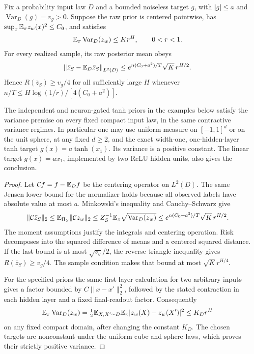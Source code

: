 \begin{corollary}
\label{cor:continuous-raw-depth-lower}
Fix a probability input law $D$ and a bounded noiseless target $g$,
with $|g|\le a$ and $\operatorname{Var}_D(g)=v_g>0$.
Suppose the raw prior is centered pointwise, has
$\sup_x\mathbb E_\pi z_w(x)^2\le C_0$, and satisfies
\[
 \mathbb E_\pi\operatorname{Var}_D(z_w)\le K r^H,\qquad 0<r<1.
\]
For every realized sample, its raw posterior mean obeys
\[
 \left\|\bar z_S-\mathbb E_D\bar z_S\right\|_{L^2(D)}
 \le e^{n(C_0+a^2)/T}\sqrt K\,r^{H/2}.
\]
Hence $R(\bar z_S)\ge v_g/4$ for all sufficiently large $H$ whenever
$n/T\le H\log(1/r)/[4(C_0+a^2)]$.

The independent and neuron-gated tanh priors in the examples below
satisfy the variance premise on every fixed compact input law,
in the same contractive variance regimes. In particular one may use
uniform measure on $[-1,1]^d$ or on the unit sphere, at any fixed
$d\ge2$, and the exact width-one, one-hidden-layer tanh target
$g(x)=a\tanh(x_1)$. Its variance is a positive constant.
The linear target $g(x)=a x_1$, implemented by two ReLU hidden units,
also gives the conclusion.
\end{corollary}
\begin{proof}
Let $\mathcal C f=f-\mathbb E_D f$ be the centering operator on $L^2(D)$.
The same Jensen lower bound for the normalizer holds because all
observed labels have absolute value at most $a$.
Minkowski's inequality and Cauchy--Schwarz give
\[
 \|\mathcal C\bar z_S\|_2
 \le\mathbb E_{\Pi_S}\|\mathcal C z_w\|_2
 \le Z_S^{-1}\mathbb E_\pi\sqrt{\operatorname{Var}_D(z_w)}
 \le e^{n(C_0+a^2)/T}\sqrt K\,r^{H/2}.
\]
The moment assumptions justify the integrals and centering operation.
Risk decomposes into the squared difference of means and a centered
squared distance. If the last bound is at most $\sqrt{v_g}/2$,
the reverse triangle inequality gives $R(\bar z_S)\ge v_g/4$.
The sample condition makes that bound at most $\sqrt K r^{H/4}$.

For the specified priors the same first-layer calculation for two
arbitrary inputs gives a factor bounded by
$C\|x-x'\|_2^2$, followed by the stated contraction in each hidden
layer and a fixed final-readout factor. Consequently
\[
 \mathbb E_\pi\operatorname{Var}_D(z_w)
 =\tfrac12\mathbb E_{X,X'\sim D}\mathbb E_\pi|z_w(X)-z_w(X')|^2
 \le K_D r^H
\]
on any fixed compact domain, after changing the constant $K_D$.
The chosen targets are nonconstant under the uniform cube and sphere
laws, which proves their strictly positive variance.
\end{proof}

